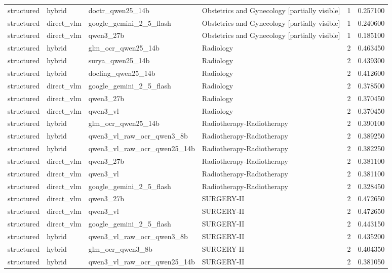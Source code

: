 \begin{tabular}{llllrr}
structured & hybrid & doctr\_qwen25\_14b & Obstetrics and Gynecology [partially visible] & 1 & 0.257100 \\
structured & direct\_vlm & google\_gemini\_2\_5\_flash & Obstetrics and Gynecology [partially visible] & 1 & 0.240600 \\
structured & direct\_vlm & qwen3\_27b & Obstetrics and Gynecology [partially visible] & 1 & 0.185100 \\
structured & hybrid & glm\_ocr\_qwen25\_14b & Radiology & 2 & 0.463450 \\
structured & hybrid & surya\_qwen25\_14b & Radiology & 2 & 0.439300 \\
structured & hybrid & docling\_qwen25\_14b & Radiology & 2 & 0.412600 \\
structured & direct\_vlm & google\_gemini\_2\_5\_flash & Radiology & 2 & 0.378500 \\
structured & direct\_vlm & qwen3\_27b & Radiology & 2 & 0.370450 \\
structured & direct\_vlm & qwen3\_vl & Radiology & 2 & 0.370450 \\
structured & hybrid & glm\_ocr\_qwen25\_14b & Radiotherapy-Radiotherapy & 2 & 0.390100 \\
structured & hybrid & qwen3\_vl\_raw\_ocr\_qwen3\_8b & Radiotherapy-Radiotherapy & 2 & 0.389250 \\
structured & hybrid & qwen3\_vl\_raw\_ocr\_qwen25\_14b & Radiotherapy-Radiotherapy & 2 & 0.382250 \\
structured & direct\_vlm & qwen3\_27b & Radiotherapy-Radiotherapy & 2 & 0.381100 \\
structured & direct\_vlm & qwen3\_vl & Radiotherapy-Radiotherapy & 2 & 0.381100 \\
structured & direct\_vlm & google\_gemini\_2\_5\_flash & Radiotherapy-Radiotherapy & 2 & 0.328450 \\
structured & direct\_vlm & qwen3\_27b & SURGERY-II & 2 & 0.472650 \\
structured & direct\_vlm & qwen3\_vl & SURGERY-II & 2 & 0.472650 \\
structured & direct\_vlm & google\_gemini\_2\_5\_flash & SURGERY-II & 2 & 0.443150 \\
structured & hybrid & qwen3\_vl\_raw\_ocr\_qwen3\_8b & SURGERY-II & 2 & 0.435200 \\
structured & hybrid & glm\_ocr\_qwen3\_8b & SURGERY-II & 2 & 0.404350 \\
structured & hybrid & qwen3\_vl\_raw\_ocr\_qwen25\_14b & SURGERY-II & 2 & 0.381050 \\

\end{tabular}
